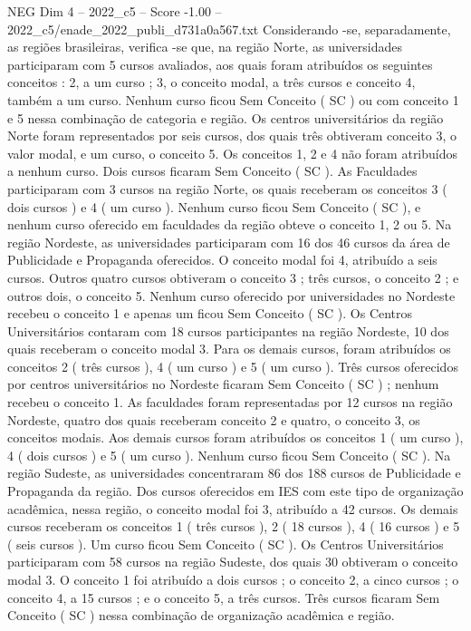 \begin{textsample}{NEG Dim 4 – 2022\_c5 – Score -1.00 – 2022\_c5/enade\_2022\_publi\_d731a0a567.txt}
Considerando -se, separadamente, as regiões brasileiras, verifica -se que, na região Norte, as universidades participaram com 5 cursos avaliados, aos quais foram atribuídos os seguintes conceitos : 2, a um curso ; 3, o conceito modal, a três cursos e conceito 4, também a um curso.
Nenhum curso ficou Sem Conceito ( SC ) ou com conceito 1 e 5 nessa combinação de categoria e região.
Os centros universitários da região Norte foram representados por seis cursos, dos quais três obtiveram conceito 3, o valor modal, e um curso, o conceito 5.
Os conceitos 1, 2 e 4 não foram atribuídos a nenhum curso.
Dois cursos ficaram Sem Conceito ( SC ).
As Faculdades participaram com 3 cursos na região Norte, os quais receberam os conceitos 3 ( dois cursos ) e 4 ( um curso ).
Nenhum curso ficou Sem Conceito ( SC ), e nenhum curso oferecido em faculdades da região obteve o conceito 1, 2 ou 5.
Na região Nordeste, as universidades participaram com 16 dos 46 cursos da área de Publicidade e Propaganda oferecidos.
O conceito modal foi 4, atribuído a seis cursos.
Outros quatro cursos obtiveram o conceito 3 ; três cursos, o conceito 2 ; e outros dois, o conceito 5.
Nenhum curso oferecido por universidades no Nordeste recebeu o conceito 1 e apenas um ficou Sem Conceito ( SC ).
Os Centros Universitários contaram com 18 cursos participantes na região Nordeste, 10 dos quais receberam o conceito modal 3.
Para os demais cursos, foram atribuídos os conceitos 2 ( três cursos ), 4 ( um curso ) e 5 ( um curso ).
Três cursos oferecidos por centros universitários no Nordeste ficaram Sem Conceito ( SC ) ; nenhum recebeu o conceito 1.
As faculdades foram representadas por 12 cursos na região Nordeste, quatro dos quais receberam conceito 2 e quatro, o conceito 3, os conceitos modais.
Aos demais cursos foram atribuídos os conceitos 1 ( um curso ), 4 ( dois cursos ) e 5 ( um curso ).
Nenhum curso ficou Sem Conceito ( SC ).
Na região Sudeste, as universidades concentraram 86 dos 188 cursos de Publicidade e Propaganda da região.
Dos cursos oferecidos em IES com este tipo de organização acadêmica, nessa região, o conceito modal foi 3, atribuído a 42 cursos.
Os demais cursos receberam os conceitos 1 ( três cursos ), 2 ( 18 cursos ), 4 ( 16 cursos ) e 5 ( seis cursos ).
Um curso ficou Sem Conceito ( SC ).
Os Centros Universitários participaram com 58 cursos na região Sudeste, dos quais 30 obtiveram o conceito modal 3.
O conceito 1 foi atribuído a dois cursos ; o conceito 2, a cinco cursos ; o conceito 4, a 15 cursos ; e o conceito 5, a três cursos.
Três cursos ficaram Sem Conceito ( SC ) nessa combinação de organização acadêmica e região.

\end{textsample}
